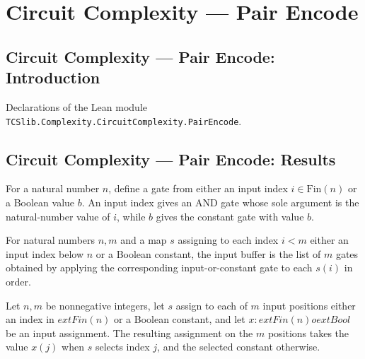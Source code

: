 \section{Circuit Complexity --- Pair Encode}
\subsection*{Circuit Complexity --- Pair Encode: Introduction}

Declarations of the Lean module \texttt{TCSlib.Complexity.CircuitComplexity.PairEncode}.

\subsection*{Circuit Complexity --- Pair Encode: Results}

\begin{definition}
\label{BoolCircuit.inputGate}
\leanok
{}
For a natural number $n$, define a gate from either an input index $i\in\mathrm{Fin}(n)$
or a Boolean value $b$. An input index gives an AND gate whose sole argument is the
natural-number value of $i$, while $b$ gives the constant gate with value $b$.
\end{definition}

\begin{definition}
\label{BoolCircuit.inputBuffer}
\leanok
{}
For natural numbers $n,m$ and a map $s$ assigning to each index $i<m$ either an input
index below $n$ or a Boolean constant, the input buffer is the list of $m$ gates
obtained by applying the corresponding input-or-constant gate to each $s(i)$ in order.
\end{definition}

\begin{definition}
\label{BoolCircuit.inputValues}
\leanok
Let $n,m$ be nonnegative integers, let $s$ assign to each of $m$ input positions either
an index in $	ext{Fin}(n)$ or a Boolean constant, and let $x:	ext{Fin}(n)	o	ext{Bool}$
be an input assignment. The resulting assignment on the $m$ positions takes the value
$x(j)$ when $s$ selects index $j$, and the selected constant otherwise.
\end{definition}

